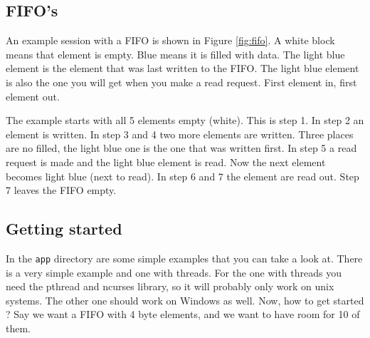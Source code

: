 \documentclass[a4paper]{article}
\begin{document}
\subsection{FIFO's}
An example session with a FIFO is shown in Figure \ref{fig:fifo}. A white block means that element is empty.
Blue means it is filled with data. The light blue element is the element that was last written to the FIFO.
The light blue element is also the one you will get when you make a read request. First element in, first element out.

The example starts with all 5 elements empty (white). This is step 1.
In step 2 an element is written. In step 3 and 4 two more elements are written.
Three places are no filled, the light blue one is the one that was written first.
In step 5 a read request is made and the light blue element is read.
Now the next element becomes light blue (next to read). In step 6 and 7 the element are read out.
Step 7 leaves the FIFO empty.

\subsection{Getting started}
In the \texttt{app} directory are some simple examples that you can take a look at.
There is a very simple example and one with threads. For the one with threads you need the
pthread and ncurses library, so it will probably only work on unix systems.
The other one should work on Windows as well. Now, how to get started ?
Say we want a FIFO with 4 byte elements, and we want to have room for 10 of them.
\end{document}
